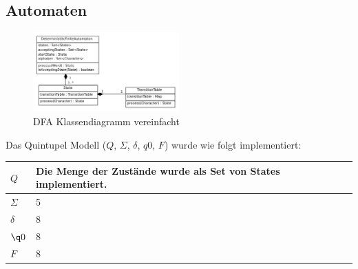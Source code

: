 \subsection{Automaten}

\begin{figure}[h]
  \centering
  \includegraphics[width=0.5\textwidth]{images/dfa_classdiag_simple.pdf}
  \caption[DFA Klassendiagramm vereinfacht]{DFA Klassendiagramm vereinfacht}
  \label{fig:dfa_classdiag_simple}
\end{figure}


Das Quintupel Modell ($Q$, $\Sigma$, $\delta$, $q0$, $F$) wurde wie folgt implementiert:

\begin{tabular}{ l | l }
  \hline
  $Q$ & Die Menge der Zustände wurde als Set von States implementiert.  \\
  \hline
  $\Sigma$ & 5 \\
  \hline
  $\delta$ & 8 \\
  \hline
  $\q0$ & 8 \\
  \hline
  $F$ & 8 \\
  \hline 
\end{tabular}

